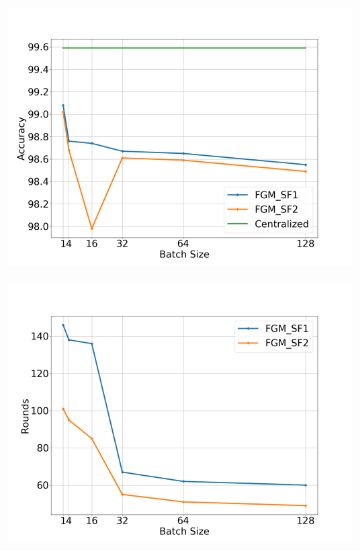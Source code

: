\begin{figure}[H]
    \centering
    \begin{subfigure}[b]{0.48\textwidth}
        \includegraphics[width=\textwidth]{./images/results/sf-comp/exp_Fig_2_1.png}
        \caption{}
    \end{subfigure}
    \begin{subfigure}[b]{0.48\textwidth}
        \includegraphics[width=\textwidth]{./images/results/sf-comp/exp_Fig_2_2.png}
        \caption{}
    \end{subfigure}
    \begin{subfigure}[b]{0.50\textwidth}

\end{subfigure}
\end{figure}
